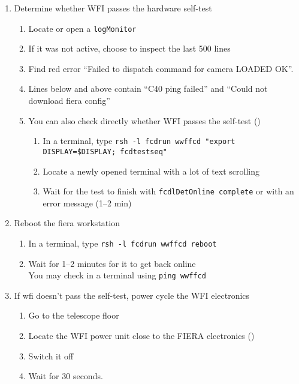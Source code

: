 \documentclass[11pt,fleqn,a4paper]{book}
\begin{document}
\begin{enumerate}
  \item Determine whether WFI passes the hardware self-test
    \begin{enumerate}
	\item Locate or open a \texttt{logMonitor}
	\item If it was not active, choose to inspect the last 500 lines
	\item Find red error ``Failed to dispatch command for camera LOADED OK''.
	\item Lines below and above contain ``C40 ping failed'' and ``Could not download \gls{fiera} config''
	\item You can also check directly whether WFI passes the self-test
            ()\\
        \begin{enumerate}
          \item In a terminal, type \texttt{rsh -l fcdrun \gls{wwffcd} "export DISPLAY=\$DISPLAY; fcdtestseq"}
          \item Locate a newly opened terminal with a lot of text scrolling
          \item Wait for the test to finish with \texttt{fcdlDetOnline complete} or with an error message (1--2 min)
        \end{enumerate} 
    \end{enumerate}
  \item\label{list:wfionline:reboot} Reboot the \gls{fiera} workstation
	\begin{enumerate}
		\item In a terminal, type \texttt{rsh -l fcdrun \gls{wwffcd} reboot}
	        \item Wait for 1--2 minutes for it to get back online\\
		      You may check in a terminal using \texttt{ping \gls{wwffcd}}
	\end{enumerate}
  \item If \gls{wfi} doesn't pass the self-test, \gls{power cycle} the WFI electronics 
	\begin{enumerate}
		\item Go to the telescope floor
		\item Locate the WFI power unit close to the FIERA electronics
			()
		\item Switch it off
                \item Wait for 30 seconds.\\

\end{enumerate}
\end{enumerate}
\end{document}
